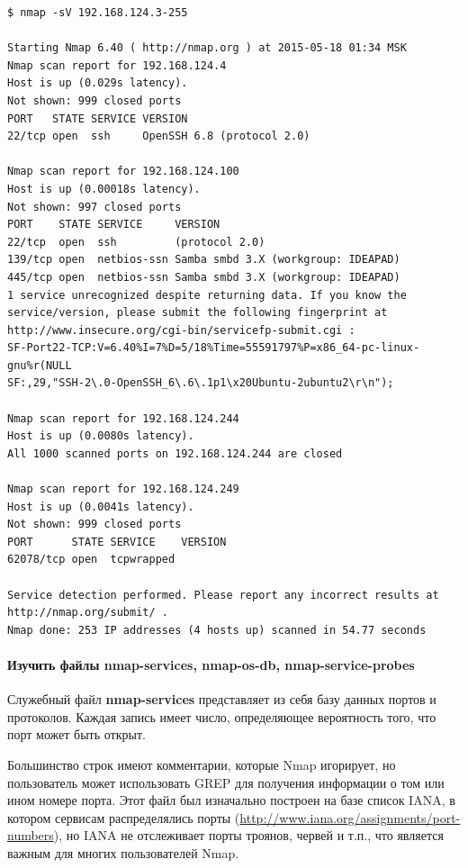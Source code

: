 \documentclass[a4paper, 12pt]{article}		%
\begin{document}
\begin{Verbatim}[frame=single]
$ nmap -sV 192.168.124.3-255

Starting Nmap 6.40 ( http://nmap.org ) at 2015-05-18 01:34 MSK
Nmap scan report for 192.168.124.4
Host is up (0.029s latency).
Not shown: 999 closed ports
PORT   STATE SERVICE VERSION
22/tcp open  ssh     OpenSSH 6.8 (protocol 2.0)

Nmap scan report for 192.168.124.100
Host is up (0.00018s latency).
Not shown: 997 closed ports
PORT    STATE SERVICE     VERSION
22/tcp  open  ssh         (protocol 2.0)
139/tcp open  netbios-ssn Samba smbd 3.X (workgroup: IDEAPAD)
445/tcp open  netbios-ssn Samba smbd 3.X (workgroup: IDEAPAD)
1 service unrecognized despite returning data. If you know the
service/version, please submit the following fingerprint at
http://www.insecure.org/cgi-bin/servicefp-submit.cgi :
SF-Port22-TCP:V=6.40%I=7%D=5/18%Time=55591797%P=x86_64-pc-linux-gnu%r(NULL
SF:,29,"SSH-2\.0-OpenSSH_6\.6\.1p1\x20Ubuntu-2ubuntu2\r\n");

Nmap scan report for 192.168.124.244
Host is up (0.0080s latency).
All 1000 scanned ports on 192.168.124.244 are closed

Nmap scan report for 192.168.124.249
Host is up (0.0041s latency).
Not shown: 999 closed ports
PORT      STATE SERVICE    VERSION
62078/tcp open  tcpwrapped

Service detection performed. Please report any incorrect results at http://nmap.org/submit/ .
Nmap done: 253 IP addresses (4 hosts up) scanned in 54.77 seconds
\end{Verbatim}

\paragraph{Изучить файлы nmap-services, nmap-os-db, nmap-service-probes}

Служебный файл \textbf{nmap-services} представляет из себя базу данных портов и протоколов. Каждая запись имеет число, определяющее вероятность того, что порт может быть открыт.

Большинство строк имеют комментарии, которые Nmap игорирует, но пользователь может использовать GREP для получения информации о том или ином номере порта. Этот файл был изначально построен на базе список IANA, в котором сервисам распределялись порты (\url{http://www.iana.org/assignments/port-numbers}), но IANA не отслеживает порты троянов, червей и т.п., что является важным для многих пользователей Nmap.
\end{document}
